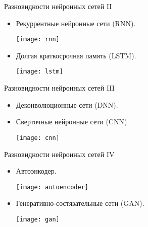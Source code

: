 \documentclass[11pt]{beamer}
\begin{document}
	\begin{frame}{Разновидности нейронных сетей II}
		\begin{itemize}
			\item Рекуррентные нейронные сети (RNN).
			\begin{center}
				\begin{minipage}{0.51\linewidth}
					\centering
					\texttt{[image: rnn]}
				\end{minipage}
			\end{center}

			\item Долгая краткосрочная память (LSTM).
			\begin{center}
				\begin{minipage}{0.51\linewidth}
					\centering
					\texttt{[image: lstm]}
				\end{minipage}
			\end{center}
			
		\end{itemize}
	\end{frame}
	
	\begin{frame}{Разновидности нейронных сетей III}
		\begin{itemize}
			\item Деконволюционные сети (DNN).
			\item Сверточные нейронные сети (CNN).
			\begin{center}
				\begin{minipage}{0.51\linewidth}
					\centering
					\texttt{[image: cnn]}
			    \end{minipage}
		    \end{center}
			
	    \end{itemize}
		
	\end{frame}

	\begin{frame}{Разновидности нейронных сетей IV}
		\begin{itemize}
			\item Автоэнкодер.
		    \begin{center}
				\begin{minipage}{0.51\linewidth}
					\centering
					\texttt{[image: autoencoder]}
				\end{minipage}
			\end{center}
			
			\item Генеративно-состязательные сети (GAN).
			\begin{center}
				\begin{minipage}{0.51\linewidth}
					\centering
					\texttt{[image: gan]}
				\end{minipage}
			\end{center}
		\end{itemize}
	\end{frame}
	
\end{document}
